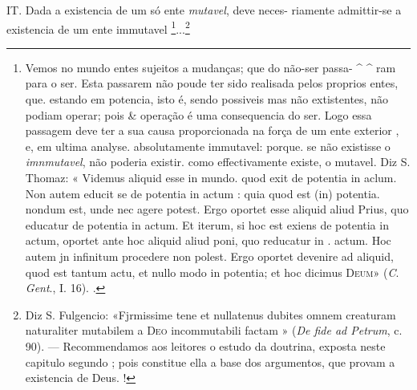 IT. Dada a existencia de um só ente \emph{mutavel}, deve neces- riamente admittir-se a existencia de um ente immutavel \footnote{Vemos no mundo entes sujeitos a mudanças; que do não-ser passa- \textasciicircum{} \textasciicircum{} ram para o ser. Esta passarem não poude ter sido realisada pelos proprios entes, que. estando em potencia, isto é, sendo possiveis mas não extistentes, não podiam operar; pois \& operação é uma consequencia do ser. Logo essa passagem deve ter a sua causa proporcionada na força de um ente exterior , e, em ultima analyse. absolutamente immutavel: porque. se não existisse o \emph{imnmutavel}, não poderia existir. como effectivamente existe, o mutavel. Diz S. Thomaz: « Videmus aliquid esse in mundo. quod exit de potentia in aclum. Non autem educit se de potentia in actum : quia quod est (in) potentia. nondum est, unde nec agere potest. Ergo oportet esse aliquid aliud Prius, quo educatur de potentia in actum. Et iterum, si hoc est exiens de potentia in actum, oportet ante hoc aliquid aliud poni, quo reducatur in . actum. Hoc autem jn infinitum procedere non polest. Ergo oportet devenire ad aliquid, quod est tantum actu, et nullo modo in potentia; et hoc dicimus \textsc{Deum}» (\emph{C}. \emph{Gent}., I. 16). .}...\footnote{Diz S. Fulgencio: «Fjrmissime tene et nullatenus dubites omnem creaturam naturaliter mutabilem a \textsc{Deo} incommutabili factam » (\emph{De fide ad Petrum}, c. 90). --- Recommendamos aos leitores o estudo da doutrina, exposta neste capitulo segundo ; pois constitue ella a base dos argumentos, que provam a existencia de Deus. !}

